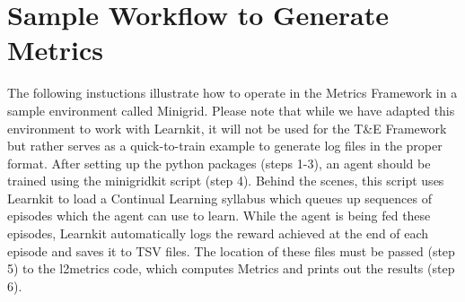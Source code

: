\section{Sample Workflow to Generate Metrics}

The following instuctions illustrate how to operate in the Metrics Framework in a sample environment called Minigrid. Please note that while we have adapted this environment to work with Learnkit, it will not be used for the T\&E Framework but rather serves as a quick-to-train example to generate log files in the proper format. After setting up the python packages (steps 1-3), an agent should be trained using the minigridkit script (step 4). Behind the scenes, this script uses Learnkit to load a Continual Learning syllabus which queues up sequences of episodes which the agent can use to learn. While the agent is being fed these episodes, Learnkit automatically logs the reward achieved at the end of each episode and saves it to TSV files. The location of these files must be passed (step 5) to the l2metrics code, which computes Metrics and prints out the results (step 6). \\[0.2in]

